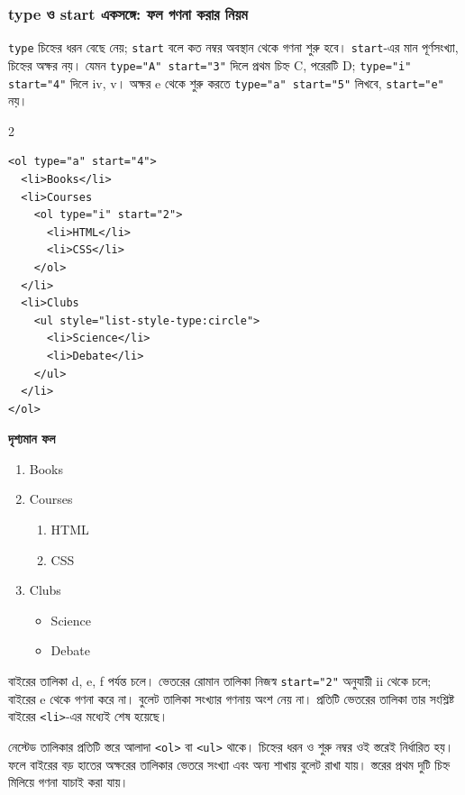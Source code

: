 \subsubsection{type ও start একসঙ্গে: ফল গণনা করার নিয়ম}
\texttt{type} চিহ্নের ধরন বেছে নেয়; \texttt{start} বলে কত নম্বর অবস্থান থেকে গণনা শুরু হবে। \texttt{start}-এর মান পূর্ণসংখ্যা, চিহ্নের অক্ষর নয়। যেমন \texttt{type="A" start="3"} দিলে প্রথম চিহ্ন C, পরেরটি D; \texttt{type="i" start="4"} দিলে iv, v। অক্ষর e থেকে শুরু করতে \texttt{type="a" start="5"} লিখবে, \texttt{start="e"} নয়।

\par{}\par
\begin{multicols}{2}
\begin{verbatim}
<ol type="a" start="4">
  <li>Books</li>
  <li>Courses
    <ol type="i" start="2">
      <li>HTML</li>
      <li>CSS</li>
    </ol>
  </li>
  <li>Clubs
    <ul style="list-style-type:circle">
      <li>Science</li>
      <li>Debate</li>
    </ul>
  </li>
</ol>
\end{verbatim}
\end{multicols}
\par\noindent\begin{minipage}[t]{.36\linewidth}\vspace{0pt}
\textbf{\color{chFourTeal}দৃশ্যমান ফল}\par
\begin{enumerate}[label=\alph*.,start=4,leftmargin=*]
\item Books
\item Courses
\begin{enumerate}[label=\roman*.,start=2,leftmargin=*]
\item HTML
\item CSS
\end{enumerate}
\item Clubs
\begin{itemize}[label=$\circ$,leftmargin=*]
\item Science
\item Debate
\end{itemize}
\end{enumerate}

\end{minipage}\hfill
\begin{minipage}[t]{.60\linewidth}\vspace{0pt}
বাইরের তালিকা d, e, f পর্যন্ত চলে। ভেতরের রোমান তালিকা নিজস্ব \texttt{start="2"} অনুযায়ী ii থেকে চলে; বাইরের e থেকে গণনা করে না। বুলেট তালিকা সংখ্যার গণনায় অংশ নেয় না। প্রতিটি ভেতরের তালিকা তার সংশ্লিষ্ট বাইরের \texttt{<li>}-এর মধ্যেই শেষ হয়েছে।
\end{minipage}\par

নেস্টেড তালিকার প্রতিটি স্তরে আলাদা \texttt{<ol>} বা \texttt{<ul>} থাকে। চিহ্নের ধরন ও শুরু নম্বর ওই স্তরেই নির্ধারিত হয়। ফলে বাইরের বড় হাতের অক্ষরের তালিকার ভেতরে সংখ্যা এবং অন্য শাখায় বুলেট রাখা যায়। স্তরের প্রথম দুটি চিহ্ন মিলিয়ে গণনা যাচাই করা যায়।

